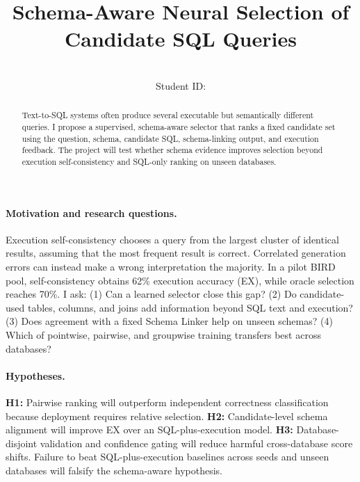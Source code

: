 \documentclass{article}
\title{Schema-Aware Neural Selection of Candidate SQL Queries}
\author{%
  \studentname\\
  Student ID: \studentid
}
\begin{document}
\maketitle

\begin{abstract}
Text-to-SQL systems often produce several executable but semantically different queries. I propose a supervised, schema-aware selector that ranks a fixed candidate set using the question, schema, candidate SQL, schema-linking output, and execution feedback. The project will test whether schema evidence improves selection beyond execution self-consistency and SQL-only ranking on unseen databases.
\end{abstract}

\paragraph{Motivation and research questions.}
Execution self-consistency chooses a query from the largest cluster of identical results, assuming that the most frequent result is correct. Correlated generation errors can instead make a wrong interpretation the majority. In a pilot BIRD pool, self-consistency obtains 62\% execution accuracy (EX), while oracle selection reaches 70\%. I ask: (1) Can a learned selector close this gap? (2) Do candidate-used tables, columns, and joins add information beyond SQL text and execution? (3) Does agreement with a fixed Schema Linker help on unseen schemas? (4) Which of pointwise, pairwise, and groupwise training transfers best across databases?

\paragraph{Hypotheses.}
\textbf{H1:} Pairwise ranking will outperform independent correctness classification because deployment requires relative selection. \textbf{H2:} Candidate-level schema alignment will improve EX over an SQL-plus-execution model. \textbf{H3:} Database-disjoint validation and confidence gating will reduce harmful cross-database score shifts. Failure to beat SQL-plus-execution baselines across seeds and unseen databases will falsify the schema-aware hypothesis.
\end{document}
